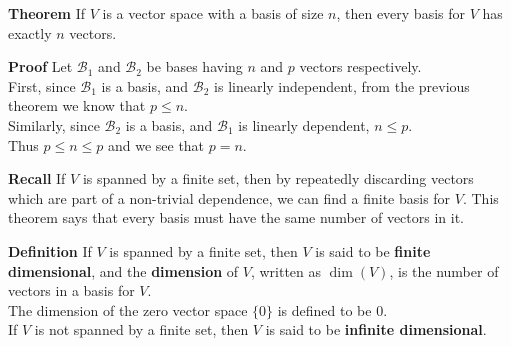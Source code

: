  \begin{frame}[fragile]
\textbf{Theorem}
If $V$ is a vector space with a basis of size $n$, then every basis for $V$ has exactly 
$n$ vectors.



\textbf{Proof}
Let ${ \mathcal B}_1$ and ${\mathcal B}_2$ be bases having $n$ and $p$ vectors respectively.  \\ 
First, since ${\mathcal B}_1$ is a basis, and ${\mathcal B}_2$ is 
linearly independent, from the previous theorem we know that $p\leq n$.  \\ 
Similarly, 
since ${\mathcal B}_2$ is a basis, and ${\mathcal B}_1$ is linearly dependent, $n \leq p$.  \\ 
Thus $p \leq n \leq p$ and we see that $p=n$.

\end{frame}






 \begin{frame}[fragile]
\textbf{Recall}
If $V$ is spanned by a finite set, then by repeatedly discarding vectors which
are part of a non-trivial dependence, we can find a finite basis for $V$.  This
theorem says that every basis must have the same number of vectors in it.




\textbf{Definition}
  If $V$ is spanned by a finite set, then $V$ is said to be \textbf{finite dimensional},  
and the \textbf{dimension} of $V$, written as $\dim(V)$, is the number of vectors in a basis for 
$V$.    \\ 
The dimension of the zero vector space $\{{0} \}$ is defined to be 0.  \\   
If  $V$ is not spanned by a finite set, then $V$ is said to be \textbf{infinite dimensional}.

\end{frame}







